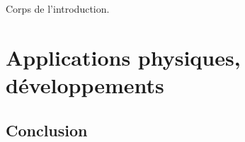 \documentclass[french]{book} %
\theoremstyle{plain}
\begin{document}
		Corps de l'introduction.

		

	\pagebreak


\part{Applications physiques, développements}


	

	

	

	







\chapter*{Conclusion}   %













%





\end{document}
